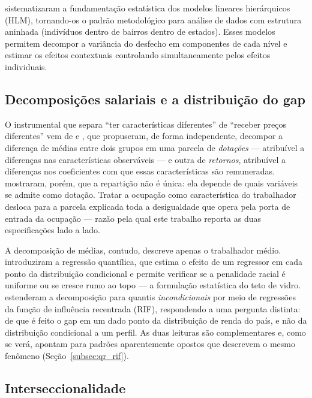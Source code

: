 \documentclass[12pt, a4paper, oneside]{article}
\let\oldsubsectionFB\subsection
\renewcommand{\subsection}{\FloatBarrier\oldsubsectionFB}
\begin{document}
 sistematizaram a fundamentação estatística dos
modelos lineares hierárquicos (HLM), tornando-os o padrão metodológico para
análise de dados com estrutura aninhada (indivíduos dentro de bairros dentro
de estados). Esses modelos permitem decompor a variância do desfecho em
componentes de cada nível e estimar os efeitos contextuais
controlando simultaneamente pelos efeitos individuais.

\subsection{Decomposições salariais e a distribuição do gap}

O instrumental que separa ``ter características diferentes'' de ``receber
preços diferentes'' vem de  e , que
propuseram, de forma independente, decompor a diferença de médias entre dois
grupos em uma parcela de \emph{dotações} --- atribuível a diferenças nas
características observáveis --- e outra de \emph{retornos}, atribuível a
diferenças nos coeficientes com que essas características são remuneradas.
 mostraram, porém, que a repartição não é única: ela
depende de quais variáveis se admite como dotação. Tratar a ocupação como
característica do trabalhador desloca para a parcela explicada toda a
desigualdade que opera pela porta de entrada da ocupação --- razão pela qual
este trabalho reporta as duas especificações lado a lado.

A decomposição de médias, contudo, descreve apenas o trabalhador médio.
 introduziram a regressão quantílica, que estima o efeito
de um regressor em cada ponto da distribuição condicional e permite verificar
se a penalidade racial é uniforme ou se cresce rumo ao topo --- a formulação
estatística do teto de vidro.  estenderam a decomposição para
quantis \emph{incondicionais} por meio de regressões da função de influência
recentrada (RIF), respondendo a uma pergunta distinta: de que é feito o gap em
um dado ponto da distribuição de renda do país, e não da distribuição
condicional a um perfil. As duas leituras são complementares e, como se verá,
apontam para padrões aparentemente opostos que descrevem o mesmo fenômeno
(Seção~\ref{subsec:qr_rif}).

\subsection{Interseccionalidade}
\end{document}
